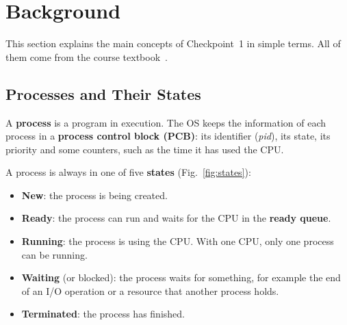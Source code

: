 \section{Background}
\label{sec:background}
This section explains the main concepts of Checkpoint~1 in simple terms. All of them come from the course textbook~\cite{silberschatz}.

\subsection{Processes and Their States}
A \textbf{process} is a program in execution. The OS keeps the information of each process in a \textbf{process control block (PCB)}: its identifier (\emph{pid}), its state, its priority and some counters, such as the time it has used the CPU.

A process is always in one of five \textbf{states} (Fig.~\ref{fig:states}):
\begin{itemize}
    \item \textbf{New}: the process is being created.
    \item \textbf{Ready}: the process can run and waits for the CPU in the \textbf{ready queue}.
    \item \textbf{Running}: the process is using the CPU. With one CPU, only one process can be running.
    \item \textbf{Waiting} (or blocked): the process waits for something, for example the end of an I/O operation or a resource that another process holds.
    \item \textbf{Terminated}: the process has finished.
\end{itemize}

